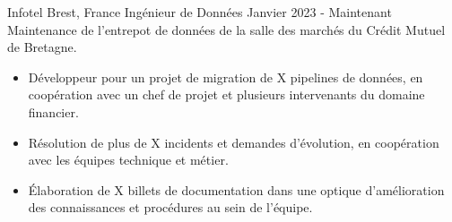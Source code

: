 Infotel
Brest, France
Ingénieur de Données
Janvier 2023 - Maintenant
Maintenance de l'entrepot de données de la salle des marchés du Crédit Mutuel de Bretagne.
\begin{itemize}
	\item Développeur pour un projet de migration de X pipelines de données, en coopération avec un chef de projet et plusieurs intervenants du domaine financier.
	\item Résolution de plus de X incidents et demandes d'évolution, en coopération avec les équipes technique et métier.
	\item Élaboration de X billets de documentation dans une optique d'amélioration des connaissances et procédures au sein de l'équipe.
\end{itemize}

\experience{}